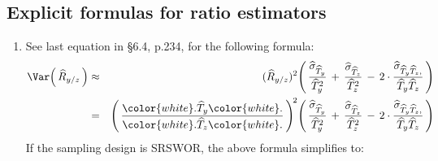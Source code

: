 
\vskip 0.5cm
\subsection{Explicit formulas for ratio estimators}


\begin{lemma}
\mbox{}
\vskip 0.01cm
\noindent
\begin{enumerate}
\item
    See last equation in \S6.4, p.234, \cite{Wolter2006} for the following formula:
    \begin{eqnarray*}
    \Var\!\left(\,\widehat{R}_{y/z}\,\right)
    & \approx &
        (\widehat{R}_{y/z})^{2}\!\left(\,
            \dfrac{\widehat{\sigma}_{\widehat{T}_{y}}}{\widehat{T}_{y}^{2}}
            \,+\,
            \dfrac{\widehat{\sigma}_{\widehat{T}_{z}}}{\widehat{T}_{z}^{2}}
            \,-\,
            2\cdot
            \dfrac{\widehat{\sigma}_{\widehat{T}_{y}\widehat{T}_{z},}}{\widehat{T}_{y}\widehat{T}_{z}}
            \,\right)
    \\
    & = &
        \left(\,
            \dfrac{{\color{white}.}
            \widehat{T}_{y}
            {\color{white}.}}{{\color{white}.}
            \widehat{T}_{z}
            {\color{white}.}}
            \,\right)^{\!2}\!\left(\,
            \dfrac{\widehat{\sigma}_{\widehat{T}_{y}}}{\widehat{T}_{y}^{2}}
            \,+\,
            \dfrac{\widehat{\sigma}_{\widehat{T}_{z}}}{\widehat{T}_{z}^{2}}
            \,-\,
            2\cdot
            \dfrac{\widehat{\sigma}_{\widehat{T}_{y}\widehat{T}_{z},}}{\widehat{T}_{y}\widehat{T}_{z}}
            \,\right)
    \end{eqnarray*}
    If the sampling design is SRSWOR, the above formula simplifies to:
    \begin{eqnarray*}

\end{eqnarray*}
\end{enumerate}
\end{lemma}
